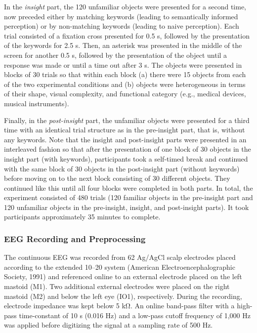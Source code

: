 \documentclass[
  english,
  man,12pt,twoside]{apa7}
\begin{document}
In the \emph{insight} part, the 120 unfamiliar objects were presented for a second time, now preceded either by matching keywords (leading to semantically informed perception) or by non-matching keywords (leading to naive perception). Each trial consisted of a fixation cross presented for 0.5 s, followed by the presentation of the keywords for 2.5 s. Then, an asterisk was presented in the middle of the screen for another 0.5 s, followed by the presentation of the object until a response was made or until a time out after 3 s. The objects were presented in blocks of 30 trials so that within each block (a) there were 15 objects from each of the two experimental conditions and (b) objects were heterogeneous in terms of their shape, visual complexity, and functional category (e.g., medical devices, musical instruments).

Finally, in the \emph{post-insight} part, the unfamiliar objects were presented for a third time with an identical trial structure as in the pre-insight part, that is, without any keywords. Note that the insight and post-insight parts were presented in an interleaved fashion so that after the presentation of one block of 30 objects in the insight part (with keywords), participants took a self-timed break and continued with the same block of 30 objects in the post-insight part (without keywords) before moving on to the next block consisting of 30 different objects. They continued like this until all four blocks were completed in both parts. In total, the experiment consisted of 480 trials (120 familiar objects in the pre-insight part and 120 unfamiliar objects in the pre-insight, insight, and post-insight parts). It took participants approximately 35 minutes to complete.

\hypertarget{eeg-recording-and-preprocessing}{%
\subsubsection{EEG Recording and Preprocessing}\label{eeg-recording-and-preprocessing}}

The continuous EEG was recorded from 62 Ag/AgCl scalp electrodes placed according to the extended 10--20 system (American Electroencephalographic Society, 1991) and referenced online to an external electrode placed on the left mastoid (M1). Two additional external electrodes were placed on the right mastoid (M2) and below the left eye (IO1), respectively. During the recording, electrode impedance was kept below 5 kΩ. An online band-pass filter with a high-pass time-constant of 10 s (0.016 Hz) and a low-pass cutoff frequency of 1,000 Hz was applied before digitizing the signal at a sampling rate of 500 Hz.
\end{document}
